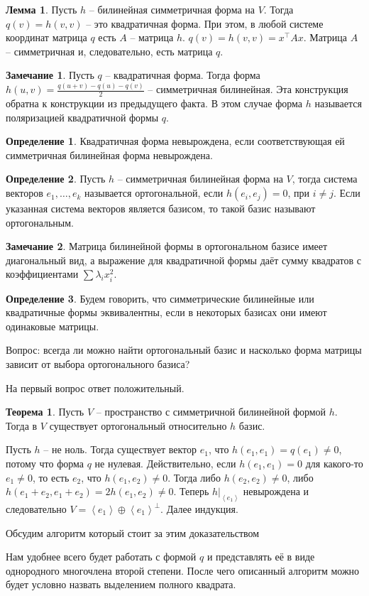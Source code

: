 \documentclass[10pt,a4paper,oneside]{book} %
\theoremstyle{definition}
\newtheorem*{rem}{Замечание}
\newtheorem*{defn}{Определение}
\newtheorem{thm}{Теорема}
\newtheorem{lem}{Лемма}
\def\lan{\left\langle }
\def\ran{\right\rangle}
\def\thrm{\begin{thm}}
\def\ethrm{\end{thm}}
\def\dfn{\begin{defn}}
\def\edfn{\end{defn}}
\def\lm{\begin{lem}}
\def\elm{\end{lem}}
\def\rm{\begin{rem}}
\def\erm{\end{rem}}
\begin{document}
\lm Пусть $h$ -- билинейная симметричная форма на $V$. Тогда $q(v)=h(v,v)$ -- это квадратичная форма. При этом, в любой системе координат матрица $q$ есть $A$ -- матрица $h$.
\proof $q(v)=h(v,v)= x^{\top}Ax$. Матрица $A$ -- симметричная и, следовательно, есть матрица $q$.
\elm




\rm
Пусть $q$ -- квадратичная форма. Тогда форма $h(u,v)=\frac{q(u+v)-q(u)-q(v)}{2}$ -- симметричная билинейная. Эта конструкция обратна к конструкции из предыдущего факта. В этом случае форма $h$ называется поляризацией квадратичной формы $q$.
\erm 


\dfn Квадратичная форма невырождена, если соответствующая ей симметричная билинейная форма невырождена.
\edfn

\dfn Пусть $h$ -- симметричная билинейная форма на $V$, тогда система векторов $e_1,\dots,e_k$ называется ортогональной, если $h(e_i,e_j)=0$, при $i\neq j$. Если указанная система векторов является базисом, то такой базис называют ортогональным.
\edfn

\rm Матрица билинейной формы в ортогональном базисе имеет диагональный вид, а выражение для квадратичной формы даёт сумму квадратов с коэффициентами $\sum \lambda_i x_i^2$.
\erm

\dfn Будем говорить, что симметрические билинейные или квадратичные формы эквивалентны, если в некоторых базисах они имеют одинаковые матрицы.
\edfn

Вопрос: всегда ли можно найти ортогональный базис и насколько форма матрицы зависит от выбора ортогонального базиса? 

На первый вопрос ответ положительный.

\thrm Пусть $V$ -- пространство с симметричной билинейной формой $h$. Тогда в $V$ существует ортогональный относительно $h$ базис. 
\ethrm
\proof
Пусть $h$ -- не ноль. Тогда существует вектор $e_1$, что $h(e_1,e_1)=q(e_1)\neq 0$, потому что форма $q$ не нулевая. Действительно, если $h(e_1,e_1)=0$ для какого-то $e_1 \neq 0$, то есть $e_2$, что $h(e_1,e_2)\neq 0$. Тогда либо $h(e_2,e_2)\neq 0$, либо $h(e_1+e_2,e_1+e_2)=2h(e_1,e_2)\neq 0$. 
Теперь $h|_{\lan e_1\ran}$ невырождена и следовательно $V=\lan e_1 \ran \oplus \lan e_1 \ran^{\bot}$. Далее индукция.
\endproof







Обсудим алгоритм который стоит за этим доказательством


Нам удобнее всего будет работать с формой $q$ и представлять её в виде однородного многочлена второй степени. После чего описанный алгоритм можно будет условно назвать выделением полного квадрата.
\end{document}
